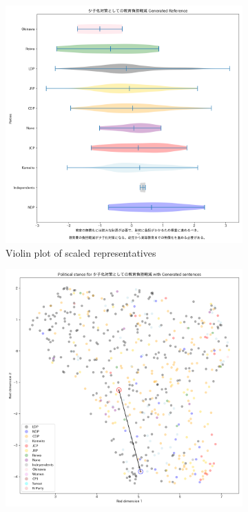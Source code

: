 \documentclass[final,5p,times,twocolumn,authoryear]{elsarticle}
\begin{document}
\begin{figure}[h]
\centering
    \begin{subfigure}{0.22\textwidth}
      \centering
      \includegraphics[width=1\linewidth]{figs/results/aging/educationcost_gen_violin_plot.png}
      \caption{Violin plot of scaled representatives}
    \end{subfigure}
    \begin{subfigure}{0.22\textwidth}
      \centering
      \includegraphics[width=\linewidth]{figs/results/aging/educationcost_umap_gen.png}

\end{subfigure}
\end{figure}
\end{document}
